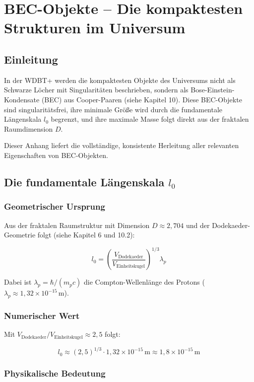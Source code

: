 \chapter{BEC-Objekte – Die kompaktesten Strukturen im Universum}

\section{Einleitung}

In der WDBT+ werden die kompaktesten Objekte des Universums nicht als 
Schwarze Löcher mit Singularitäten beschrieben, sondern als 
Bose-Einstein-Kondensate (BEC) aus Cooper-Paaren (siehe Kapitel 10). 
Diese BEC-Objekte sind singularitätsfrei, ihre minimale Größe wird durch 
die fundamentale Längenskala \( l_0 \) begrenzt, und ihre maximale Masse 
folgt direkt aus der fraktalen Raumdimension \( D \).

Dieser Anhang liefert die vollständige, konsistente Herleitung aller 
relevanten Eigenschaften von BEC-Objekten.

\section{Die fundamentale Längenskala \( l_0 \)}

\subsection{Geometrischer Ursprung}

Aus der fraktalen Raumstruktur mit Dimension \( D \approx 2,704 \) und der 
Dodekaeder-Geometrie folgt (siehe Kapitel 6 und 10.2):

\[
l_0 = \left( \frac{V_{\text{Dodekaeder}}}{V_{\text{Einheitskugel}}} \right)^{1/3} \lambda_p \tag{L.1}
\]

Dabei ist \( \lambda_p = \hbar / (m_p c) \) die Compton-Wellenlänge des 
Protons (\( \lambda_p \approx 1,32 \times 10^{-15} \, \text{m} \)).

\subsection{Numerischer Wert}

Mit \( V_{\text{Dodekaeder}} / V_{\text{Einheitskugel}} \approx 2,5 \) folgt:

\[
l_0 \approx (2,5)^{1/3} \cdot 1,32 \times 10^{-15} \, \text{m} \approx 1,8 \times 10^{-15} \, \text{m} \tag{L.2}
\]

\subsection{Physikalische Bedeutung}

